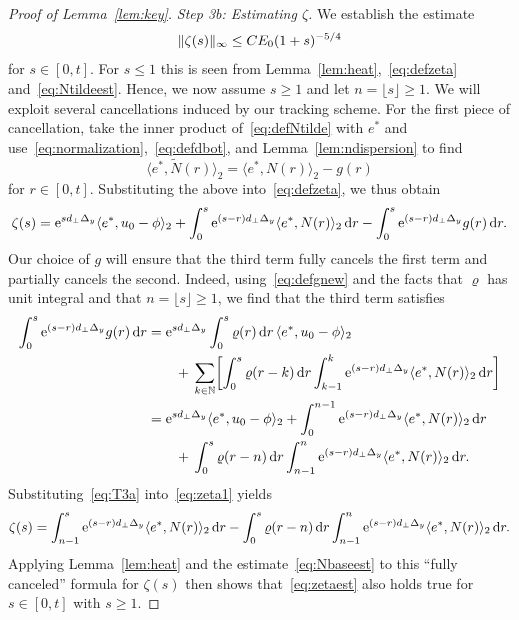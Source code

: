 \documentclass[12pt,oneside,a4paper,reqno]{amsart}
\numberwithin{equation}{section}
\theoremstyle{definition}
\theoremstyle{remark}
\newcommand{\bbN}{{\mathbb N}}
\newcommand{\rd}{{\,\rm{d}}}
\newcommand{\re}{{\rm e}}
\DeclarePairedDelimiter{\norm}{\lVert}{\rVert}
\DeclarePairedDelimiter{\sqr}{[}{]}
\begin{document}
\begin{proof}[Proof of Lemma~\ref{lem:key}]
\emph{Step 3b: Estimating $\zeta$.}
We establish the estimate
\begin{align}
    \label{eq:zetaest}
    \norm{\zeta(s)}_{\infty} \leq C E_0 (1+s)^{-5/4}
\end{align}
for $s \in [0,t]$. 
For $s \leq 1$ this is seen from Lemma~\ref{lem:heat},~\eqref{eq:defzeta} and~\eqref{eq:Ntildeest}.
Hence, we now assume $s \geq 1$ and let $n = \lfloor s \rfloor \geq 1$.
We will exploit several cancellations induced by our tracking scheme.
For the first piece of cancellation, take the inner product of~\eqref{eq:defNtilde} with $e^*$ and use~\eqref{eq:normalization},~\eqref{eq:defdbot}, and Lemma~\ref{lem:ndispersion} to find
\begin{equation*}
    \langle e^*,\widetilde{N}(r)\rangle_2 =\langle e^*,N(r)\rangle_2 - g(r)
\end{equation*}
for $r \in [0,t]$. Substituting the above into~\eqref{eq:defzeta}, we thus obtain
\begin{equation}
    \label{eq:zeta1}
    \zeta(s) = \re^{sd_{\bot}\Delta_y} \langle e^*, u_0 - \phi\rangle_2 + \int_0^s \re^{(s-r)d_{\bot}\Delta_y}\langle e^*,N(r)\rangle_2 \rd r
    - \int_0^s \re^{(s-r)d_{\bot}\Delta_y} g(r) \rd r.
\end{equation}
Our choice of $g$ will ensure that the third term fully cancels the first term and partially cancels the second.
Indeed, using~\eqref{eq:defgnew} and the facts that $\varrho$ has unit integral and that $n = \lfloor s \rfloor \geq 1$, we find that the third term satisfies
\begin{equation}
\label{eq:T3a}
\begin{aligned}
    \int_0^s \re^{(s-r)d_{\bot}\Delta_y} g(r) \rd r
    &= \re^{s d_{\bot}\Delta_y}\int_0^s \varrho(r) \rd r \, \langle e^*,u_0 - \phi\rangle_2 \\
    &\qquad+ \,\sum_{k \in \bbN}\sqr[\bigg]{ \int_0^s \varrho(r-k) \rd r \int_{k-1}^k \re^{(s - r)d_{\bot}\Delta_y}\langle e^*,N(r)\rangle_2\rd r} \\
    &= \re^{s d_{\bot}\Delta_y}\langle e^*,u_0 - \phi \rangle_2 +\int_0^{n-1}\re^{(s-r)d_{\bot}\Delta_y}\langle e^*,N(r)\rangle_2 \rd r \\
    &\qquad+\,\int_0^s \varrho(r-n)\rd r \int_{n-1}^n \re^{(s-r)d_{\bot}\Delta_y}\langle e^*,N(r)\rangle_2 \rd r.
\end{aligned}
\end{equation}
Substituting~\eqref{eq:T3a} into~\eqref{eq:zeta1} yields
\begin{align*}
    \zeta(s) = \int_{n-1}^s \re^{(s-r)d_{\bot}\Delta_y} \langle e^*,N(r)\rangle_2 \rd r
    - \int_0^s \varrho(r - n)\rd r\int_{n-1}^{n} \re^{(s-r)d_{\bot}\Delta_y} \langle e^*,N(r)\rangle_2 \rd r.
\end{align*}
Applying Lemma~\ref{lem:heat} and the estimate~\eqref{eq:Nbaseest} to this ``fully canceled'' formula for $\zeta(s)$ then shows that~\eqref{eq:zetaest} also holds true for $s \in [0,t]$ with $s \geq 1$.


\end{proof}
\end{document}
